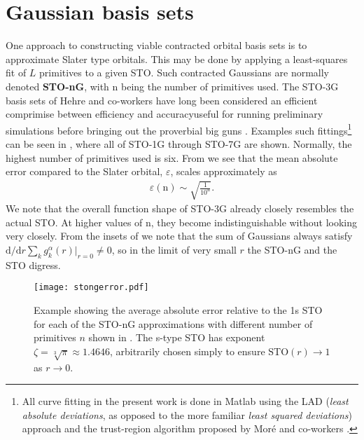 \documentclass[../../master.tex]{subfiles}
\begin{document}
\section{Gaussian basis sets}
One approach to constructing viable contracted orbital basis sets is to approximate Slater type orbitals. This may be done by applying a least-squares fit of $L$ primitives to a given STO. Such contracted Gaussians are normally denoted {\bf STO-nG}, with n being the number of primitives used. The STO-3G basis sets of Hehre and co-workers have long been considered an efficient comprimise between efficiency and accuracy\textemdash useful for running preliminary simulations before bringing out the proverbial big guns \cite{hehre,cramer,taylor}. Examples such fittings\footnote{All curve fitting in the present work is done in {\sc Matlab} using the LAD (\emph{least absolute deviations}, as opposed to the more familiar \emph{least squared deviations}) approach and the trust-region algorithm proposed by Moré and co-workers \cite{charnes1955optimal,koenker1978regression,more1983computing}.} can be seen in , where all of STO-1G through STO-7G are shown. Normally, the highest number of primitives used is six. From  we see that the mean absolute error compared to the Slater orbital, $\varepsilon$, scales approximately as 
\begin{align}
\varepsilon(\text{n})\sim \sqrt{\frac{1}{10^\text{n}}}.
\end{align}
We note that the overall function shape of STO-3G already closely resembles the actual STO. At higher values of n, they become indistinguishable without looking very closely. From the insets of  we note that the sum of Gaussians always satisfy $\mathrm{d}/\mathrm{d}r \sum_k g_k^\alpha(r)\big|_{r=0}\not=0$, so in the limit of very small $r$ the STO-nG and the STO digress. 

\begin{SCfigure}
\centering
\texttt{[image: stongerror.pdf]}
\caption{Example showing the average absolute error relative to the 1s STO  for each of the STO-nG approximations with different number of primitives $n$ shown in . The s-type STO has exponent $\zeta=\sqrt[3]{\pi}\approx1.4646$, arbitrarily chosen simply to ensure $\text{STO}(r)\rightarrow1$ as $r\rightarrow0$. \label{fig:stoerror}}
\end{SCfigure}
\end{document}
